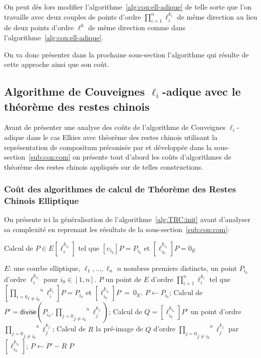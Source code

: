 \documentclass[10pt,a4paper]{book}
\theoremstyle{plain}
\theoremstyle{definition}
\theoremstyle{definition}
\theoremstyle{definition}
\theoremstyle{definition}
\theoremstyle{remark}
\theoremstyle{remark}
\theoremstyle{definition}
\begin{document}
 On peut dès lors modifier l'algorithme~\ref{alg:cou:ell-adique} de telle sorte
 que l'on travaille avec deux couples de points d'ordre 
 $\prod_{i=1}^n\ell_i^{k_i}$ de même direction au lieu de deux points d'ordre
 $\ell^k$ de même direction comme dans l'algorithme~\ref{alg:cou:ell-adique}.
 
 On va donc présenter dans la prochaine sous-section l'algorithme qui résulte 
 de cette approche ainsi que son coût.

\subsection{Algorithme de Couveignes $\ell_i$-adique avec le théorème des restes chinois}

Avant de présenter une analyse des coûts de l'algorithme de Couveignes 
$\ell_i$-adique dans le cas Elkies avec théorème des restes chinois utilisant la 
représentation de compositum préconisée par \cite{DeFeoDoliskaniSchost14} et 
développée dans la sous-section~\ref{sub:con:com} on présente tout d'abord les coûts 
d'algorithmes de théorème des restes chinois appliqués sur de telles constructions.

\subsubsection{Coût des algorithmes de calcul de Théorème des Restes Chinois Elliptique}

On présente ici la généralisation de l'algorithme~\ref{alg:TRC:init} avant 
d'analyser sa complexité en reprenant les résultats de la 
sous-section~\ref{sub:con:com}: 


\begin{algorithm}
\caption{ \label{alg:TRC:init:gen}  Calcul de $P \in E[\ell_i^{k_{i_0}}]$ tel que 
$[\upsilon_{i_0}]P=P_{i_0}$ 
et $[\ell_{i_0}^{k_{i_0}}]P=0_E$}
\begin{algorithmic}[1]
\REQUIRE $E$: une courbe elliptique, $\ell_1, \dots, \ell_n$ $n$ nombres premiers distincts, un point $P_{i_0}$ d'ordre $\ell_i^{k_{i_0}}$ pour $i_0 \in [1,n]$.
\ENSURE $P$ un point de $E$ d'ordre $\prod_{i=1}^n \ell_i^{k_i}$  tel que $[\overset{n}{\underset{i \neq i_0}{\underset{i = 0}{\prod}}}\ell_i^{k_i} ]P=P_{i_0}$ et $[\ell_{i_0}^{k_{i_0}}]P~=~0_E$.
\STATE $P \leftarrow P_{i_0}$;
\STATE \label{alg:TRC:init:gen:div} Calcul de $P'=\mathsf{divise}(P_{i_0},\overset{n}{\underset{j \neq i_0}{\underset{j = 0}{\prod}}}\ell_j^{k_j})$;
\STATE \label{alg:TRC:init:gen:mul} Calcul de $Q=[\ell_{i_0}^{k_{i_0}}]P'$ un point d'ordre $\overset{n}{\underset{j \neq i_0}{\underset{j = 0}{\prod}}}\ell_j^{k_j}$;
\STATE \label{alg:TRC:init:gen:prim} Calcul de $R$ la pré-image de $Q$ d'ordre $\overset{n}{\underset{j \neq i_0}{\underset{j = 0}{\prod}}}\ell_j^{k_j}$ par $[\ell_{i_0}^{k_{i_0}}]$;
\STATE \label{alg:TRC:init:gen:add}$P \leftarrow P'-R$
\RETURN $P$
\end{algorithmic}
\end{algorithm}
\end{document}
